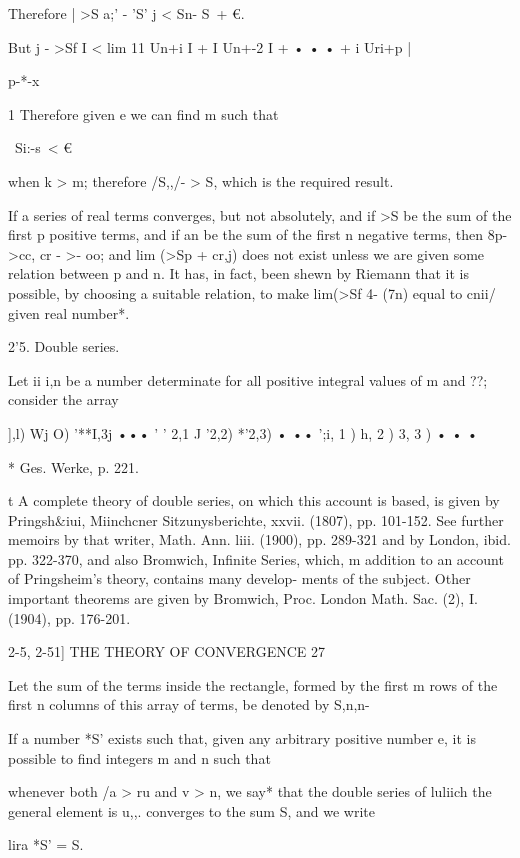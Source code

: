 Therefore | >S a;' - 'S' j < Sn- S\ + €.

But j - >Sf I < lim 11 Un+i I + I Un+-2 I + • • • + i Uri+p |

p-*-x

1 Therefore given e we can find m such that

\ Si:-s\ < €

when k > m; therefore /S,,/- > S, which is the required result.

If a series of real terms converges, but not absolutely, and if >S be
the sum of the first p positive terms, and if an be the sum of the
first n negative terms, then 8p->cc, cr - >- oo; and lim (>Sp + cr,j)
does not exist unless we are given some relation between p and n. It
has, in fact, been shewn by Riemann that it is possible, by choosing a
suitable relation, to make lim(>Sf 4- (7n) equal to cnii/ given real
number*.

2'5. Double series.

Let ii i,n be a number determinate for all positive integral values of
m and ??; consider the array

 ],l) Wj O) '**I,3j ••• ' ' 2,1 J '2,2) *'2,3) • •• ';i, 1 ) h, 2 ) 3,
3 ) • • •



* Ges. Werke, p. 221.

t A complete theory of double series, on which this account is based,
is given by Pringsh\&iui, Miinchcner Sitzunysberichte, xxvii. (1807),
pp. 101-152. See further memoirs by that writer, Math. Ann. liii.
(1900), pp. 289-321 and by London, ibid. pp. 322-370, and also
Bromwich, Infinite Series, which, m addition to an account of
Pringsheim's theory, contains many develop- ments of the subject.
Other important theorems are given by Bromwich, Proc. London Math.
Sac. (2), I. (1904), pp. 176-201.



2-5, 2-51] THE THEORY OF CONVERGENCE 27

Let the sum of the terms inside the rectangle, formed by the first m
rows of the first n columns of this array of terms, be denoted by
S,n,n-

If a number *S' exists such that, given any arbitrary positive number
e, it is possible to find integers m and n such that

whenever both /a > ru and v > n, we say* that the double series of
luliich the general element is u,,. converges to the sum S, and we
write

lira *S' = S.




